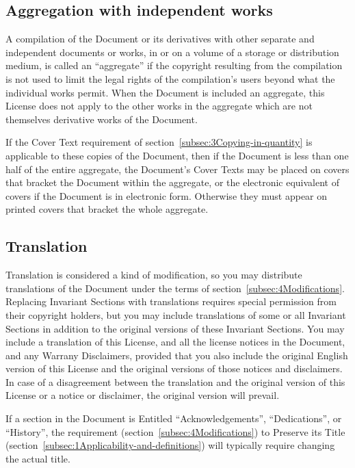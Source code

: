 \subsection{Aggregation with independent works}

A compilation of the Document or its derivatives with other separate
and independent documents or works, in or on a volume of a storage
or distribution medium, is called an ``aggregate'' if the copyright
resulting from the compilation is not used to limit the legal rights
of the compilation's users beyond what the individual works permit.
When the Document is included an aggregate, this License does not
apply to the other works in the aggregate which are not themselves
derivative works of the Document.

If the Cover Text requirement of section~\ref{subsec:3Copying-in-quantity}
is applicable to these copies of the Document, then if the Document
is less than one half of the entire aggregate, the Document's Cover
Texts may be placed on covers that bracket the Document within the
aggregate, or the electronic equivalent of covers if the Document
is in electronic form. Otherwise they must appear on printed covers
that bracket the whole aggregate.

\subsection{Translation}

Translation is considered a kind of modification, so you may distribute
translations of the Document under the terms of section~\ref{subsec:4Modifications}.
Replacing Invariant Sections with translations requires special permission
from their copyright holders, but you may include translations of
some or all Invariant Sections in addition to the original versions
of these Invariant Sections. You may include a translation of this
License, and all the license notices in the Document, and any Warrany
Disclaimers, provided that you also include the original English version
of this License and the original versions of those notices and disclaimers.
In case of a disagreement between the translation and the original
version of this License or a notice or disclaimer, the original version
will prevail.

If a section in the Document is Entitled ``Acknowledgements'', ``Dedications'',
or ``History'', the requirement (section~\ref{subsec:4Modifications})
to Preserve its Title (section~\ref{subsec:1Applicability-and-definitions})
will typically require changing the actual title.

